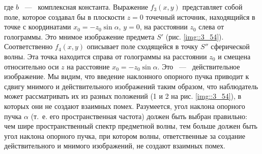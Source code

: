 где $b$ ~---~ комплексная константа. Выражение $f_3(x,y)$ представляет собой
поле, которое создавал бы в плоскости $z = 0$ точечный источник, находящийся в точке с координатами
$x_0 = -z_0 \sin{\alpha}$, $y = 0$, на расстоянии $z_0$ слева от голограммы.
Это мнимое изображение предмета $S'$ (рис. \ref{img::3_54}).
Соответственно $f_4(x,y)$ описывает поле сходящейся в точку $S''$
сферической волны. Эта точка находится справа от голограммы на расстоянии
$z_0$ и смещена относительно оси $z$ на расстояние $x_0 = -z_0 \sin{\alpha}$.
Это ~---~ действительное изображение. Мы видим, что введение наклонного
опорного пучка приводит к сдвигу мнимого и действительного изображений таким образом, что наблюдатель может рассматривать их из
разных положений (1 и 2 на рис. \ref{img::3_54}), в которых они не создают взаимных помех.
Разумеется, угол наклона опорного пучка $\alpha$ (т.~е. его пространственная частота) должен быть выбран правильно: чем шире
пространственный спектр предметной волны, тем больше должен быть угол наклона опорного пучка, при котором волны, ответственные за создание действительного и мнимого изображений, не создают взаимных помех.